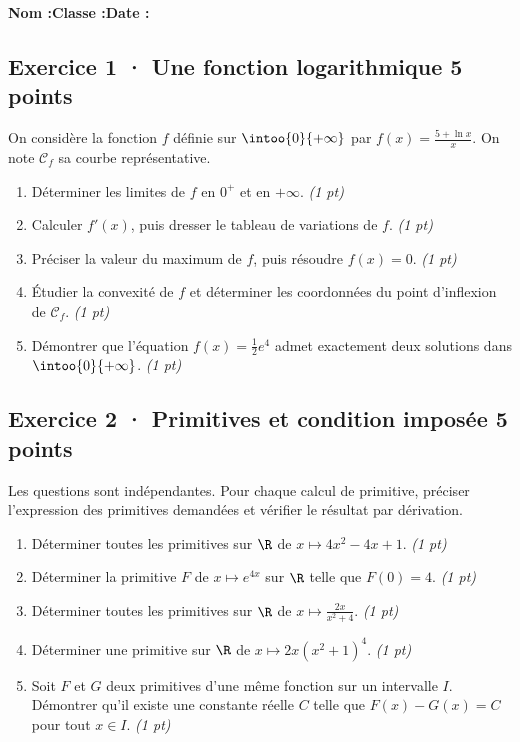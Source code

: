 \smallskip\textbf{Nom :}\enspace\dotfill\quad\textbf{Classe :}\enspace\dotfill\quad\textbf{Date :}\enspace\dotfill

\subsection*{Exercice 1 · Une fonction logarithmique \hfill 5 points}On considère la fonction $f$ définie sur $\intoo{0}{+\infty}$ par $f(x)=\frac{5+\ln x}x$. On note $\mathcal C_f$ sa courbe représentative.

\begin{enumerate}

\item Déterminer les limites de $f$ en $0^+$ et en $+\infty$. \hfill\textit{(1 pt)}

\item Calculer $f' (x)$, puis dresser le tableau de variations de $f$. \hfill\textit{(1 pt)}

\item Préciser la valeur du maximum de $f$, puis résoudre $f(x)=0$. \hfill\textit{(1 pt)}

\item Étudier la convexité de $f$ et déterminer les coordonnées du point d'inflexion de $\mathcal C_f$. \hfill\textit{(1 pt)}

\item Démontrer que l'équation $f(x)=\frac12 e^{4}$ admet exactement deux solutions dans $\intoo{0}{+\infty}$. \hfill\textit{(1 pt)}

\end{enumerate}

\subsection*{Exercice 2 · Primitives et condition imposée \hfill 5 points}Les  questions sont indépendantes. Pour chaque calcul de primitive, préciser l'expression des primitives demandées et vérifier le résultat par dérivation.

\begin{enumerate}

\item Déterminer toutes les primitives sur $\R$ de $x\mapsto 4x^2-4x+1$. \hfill\textit{(1 pt)}

\item Déterminer la primitive $F$ de $x\mapsto e^{4x}$ sur $\R$ telle que $F(0)=4$. \hfill\textit{(1 pt)}

\item Déterminer toutes les primitives sur $\R$ de $x\mapsto\frac{2x}{x^2+4}$. \hfill\textit{(1 pt)}

\item Déterminer une primitive sur $\R$ de $x\mapsto2x(x^2+1)^{4}$. \hfill\textit{(1 pt)}

\item Soit $F$ et $G$ deux primitives d'une même fonction sur un intervalle $I$. Démontrer qu'il existe une constante réelle $C$ telle que $F(x)-G(x)=C$ pour tout $x\in I$. \hfill\textit{(1 pt)}

\end{enumerate}

